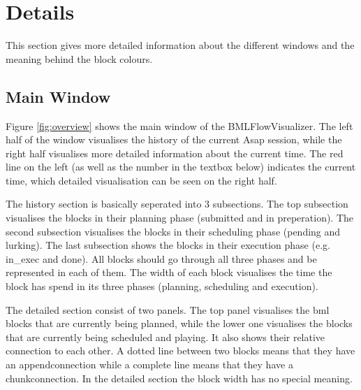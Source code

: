 \documentclass[12pt,a4paper]{article}
\begin{document}
\section{Details}

This section gives more detailed information about the different windows and the meaning behind the block colours.

\subsection{Main Window \label{sec:mainWin}}
Figure \ref{fig:overview} shows the main window of the BMLFlowVisualizer. The left half of the window visualises the history of the current Asap session, while the right
half visualises more detailed information about the current time. The red line on the left (as well as the number in the textbox below) 
indicates the current time, which detailed visualisation can be seen on the right half. 

The history section is basically seperated into 3 subsections. The top subsection visualises the blocks in their planning phase (submitted and in preperation).
The second subsection visualises the blocks in their scheduling phase (pending and lurking). The last subsection shows the blocks in their execution phase 
(e.g. in\_exec and done). All blocks should go through all three phases and be represented in each of them. The width of each block visualises the time 
the block has spend in its three phases (planning, scheduling and execution). 

The detailed section consist of two panels. The top panel visualises the bml blocks that are currently being planned, while the lower one visualises the blocks that are 
currently being scheduled and playing. It also shows their relative connection to each other. A dotted line between two blocks means that they have an \glqq append\grqq connection
while a complete line means that they have a \glqq chunk\grqq connection. In the detailed section the block width has no special meaning.
\end{document}

